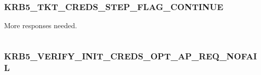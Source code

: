 \documentclass[letterpaper,10pt,english]{sphinxmanual}
\begin{document}
\subsubsection{KRB5\_TKT\_CREDS\_STEP\_FLAG\_CONTINUE}
\label{appdev/refs/macros/KRB5_TKT_CREDS_STEP_FLAG_CONTINUE:krb5-tkt-creds-step-flag-continue-data}\label{appdev/refs/macros/KRB5_TKT_CREDS_STEP_FLAG_CONTINUE::doc}\label{appdev/refs/macros/KRB5_TKT_CREDS_STEP_FLAG_CONTINUE:krb5-tkt-creds-step-flag-continue}

\begin{fulllineitems}
\label{appdev/refs/macros/KRB5_TKT_CREDS_STEP_FLAG_CONTINUE:KRB5_TKT_CREDS_STEP_FLAG_CONTINUE}
\end{fulllineitems}


More responses needed.

\begin{tabulary}{\linewidth}{|L|L|}
\hline

 & 
\\
\hline\end{tabulary}



\subsubsection{KRB5\_VERIFY\_INIT\_CREDS\_OPT\_AP\_REQ\_NOFAIL}
\label{appdev/refs/macros/KRB5_VERIFY_INIT_CREDS_OPT_AP_REQ_NOFAIL:krb5-verify-init-creds-opt-ap-req-nofail}\label{appdev/refs/macros/KRB5_VERIFY_INIT_CREDS_OPT_AP_REQ_NOFAIL::doc}\label{appdev/refs/macros/KRB5_VERIFY_INIT_CREDS_OPT_AP_REQ_NOFAIL:krb5-verify-init-creds-opt-ap-req-nofail-data}

\begin{fulllineitems}
\label{appdev/refs/macros/KRB5_VERIFY_INIT_CREDS_OPT_AP_REQ_NOFAIL:KRB5_VERIFY_INIT_CREDS_OPT_AP_REQ_NOFAIL}
\end{fulllineitems}


\begin{tabulary}{\linewidth}{|L|L|}
\hline

 & 
\\
\hline\end{tabulary}
\end{document}
